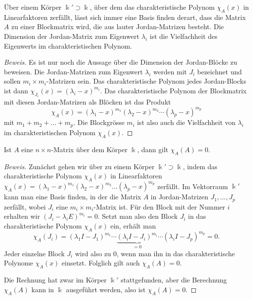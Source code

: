 \begin{satz}
\label{buch:eigenwerte:satz:jordannormalform}
Über einem Körper $\Bbbk'\supset\Bbbk$, über dem das charakteristische
Polynom $\chi_A(x)$ in Linearfaktoren zerfällt, lässt sich immer
eine Basis finden derart, dass die Matrix $A$ zu einer Blockmatrix wird,
die aus lauter Jordan-Matrizen besteht.
Die Dimension der Jordan-Matrix zum Eigenwert $\lambda_i$ ist die
Vielfachheit des Eigenwerts im charakteristischen Polynom.
\end{satz}

\begin{proof}[Beweis]
Es ist nur noch die Aussage über die Dimension der Jordan-Blöcke zu
beweisen.
Die Jordan-Matrizen zum Eigenwert $\lambda_i$ werden mit $J_i$
bezeichnet und sollen $m_i\times m_i$-Matrizen sein.
Das charakteristische Polynom jedes Jordan-Blocks ist dann
$\chi_{J_i}(x)=(\lambda_i-x)^{m_i}$.
Das charakteristische Polynom der Blockmatrix mit diesen Jordan-Matrizen
als Blöcken ist das Produkt
\[
\chi_A(x)
=
(\lambda_1-x)^{m_1}
(\lambda_2-x)^{m_2}
\cdots
(\lambda_p-x)^{m_p}
\]
mit $m_1+m_2+\dots+m_p$.
Die Blockgrösse $m_i$ ist also auch die Vielfachheit von $\lambda_i$ im
charakteristischen Polynom $\chi_A(x)$.
\end{proof}



\begin{satz}
\label{buch:normalformen:satz:cayley-hamilton}
Ist $A$ eine $n\times n$-Matrix über dem Körper $\Bbbk$, dann gilt
$\chi_A(A)=0$.
\end{satz}

\begin{proof}[Beweis]
Zunächst gehen wir über zu einem Körper $\Bbbk'\supset\Bbbk$, indem
das charakteristische Polynom $\chi_A(x)$ in Linearfaktoren
$\chi_A(x)
=
(\lambda_1-x)^{m_1}
(\lambda_2-x)^{m_2}
\dots
(\lambda_p-x)^{m_p}$
zerfällt.
Im Vektorraum $\Bbbk'$ kann man eine Basis finden, in der die Matrix
$A$ in Jordan-Matrizen $J_1,\dots,J_p$ zerfällt, wobei $J_i$ eine
$m_i\times m_i$-Matrix ist.
Für den Block mit der Nummer $i$ erhalten wir
$(J_i - \lambda_i E)^{m_i} = 0$.
Setzt man also den Block $J_i$ in das charakteristische Polynom
$\chi_A(x)$ ein, erhält man
\[
\chi_A(J_i)
=
(\lambda_1I - J_1)^{m_1}
\cdots
\underbrace{
(\lambda_iI - J_i)^{m_i}
}_{\displaystyle=0}
\cdots
(\lambda_iI - J_p)^{m_p}
=
0.
\]
Jeder einzelne Block $J_i$ wird also zu $0$, wenn man ihn in das
charakteristische Polynome $\chi_A(x)$ einsetzt.
Folglich gilt auch $\chi_A(A)=0$.

Die Rechnung hat zwar im Körper $\Bbbk'$ stattgefunden, aber die Berechnung
$\chi_A(A)$ kann in $\Bbbk$ ausgeführt werden, also ist $\chi_A(A)=0$.
\end{proof}

